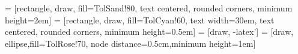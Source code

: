  = [rectangle, draw, fill=TolSand!80, text centered, rounded corners, minimum height=2em]
 = [rectangle, draw, fill=TolCyan!60,
    text width=30em, text centered, rounded corners, minimum height=0.5em]
 = [draw, -latex']
 = [draw, ellipse,fill=TolRose!70, node distance=0.5cm,minimum height=1em]


\usepackage{caption}
\captionsetup{format=plain, justification=centering}

\usepackage{hyphenat}
